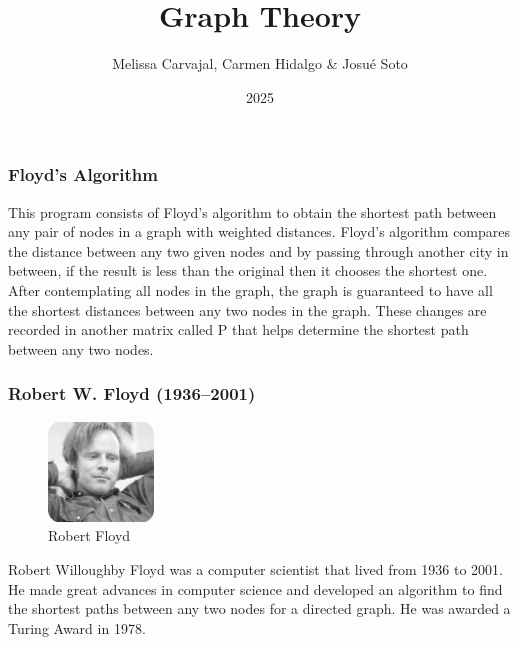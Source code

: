 \documentclass{beamer}
\title{Graph Theory}
\author{Melissa Carvajal, Carmen Hidalgo \& Josu\'e Soto}
\institute{Investigaci\'on de Operaciones}
\date{2025}
\begin{document}
\maketitle

\begin{frame}

\frametitle{Floyd's Algorithm}
This program consists of Floyd's algorithm to obtain the shortest path between any pair of nodes in a graph with weighted distances.
Floyd's algorithm compares the distance between any two given nodes and by passing through another city in between, if the result is less than the original then it chooses the shortest one. After contemplating all nodes in the graph, the graph is guaranteed to have all the shortest distances between any two nodes in the graph. These changes are recorded in another matrix called P that helps determine the shortest path between any two nodes.
\end{frame}



\begin{frame}
\frametitle{Robert W. Floyd (1936–2001)}
\begin{figure}

\includegraphics[width=0.25\textwidth]{floyd.jpg}
\caption{\label{fig:floyd}Robert Floyd}
\end{figure}
Robert Willoughby Floyd was a computer scientist that lived from 1936 to 2001. He made great advances in computer science and developed an algorithm to find the shortest paths between any two nodes for a directed graph. He was awarded a Turing Award in 1978.
\end{frame}
\end{document}
